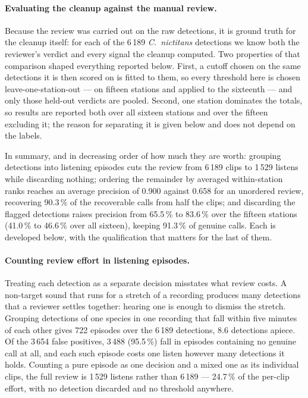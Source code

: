 \documentclass[final,3p,times]{elsarticle}
\begin{document}
\paragraph{Evaluating the cleanup against the manual review.}
Because the review was carried out on the raw detections, it is ground truth
for the cleanup itself: for each of the 6\,189 \textit{C.\ nictitans} detections
we know both the reviewer's verdict and every signal the cleanup computed. Two
properties of that comparison shaped everything reported below. First, a cutoff
chosen on the same detections it is then scored on is fitted to them, so every
threshold here is chosen leave-one-station-out --- on fifteen stations and
applied to the sixteenth --- and only those held-out verdicts are pooled.
Second, one station dominates the totals, so results are reported both over all
sixteen stations and over the fifteen excluding it; the reason for separating
it is given below and does not depend on the labels.

In summary, and in decreasing order of how much they are worth: grouping
detections into listening episodes cuts the review from 6\,189 clips to 1\,529
listens while discarding nothing; ordering the remainder by averaged
within-station ranks reaches an average precision of 0.900 against 0.658 for an
unordered review, recovering 90.3\,\% of the recoverable calls from half the
clips; and discarding the flagged detections raises precision from 65.5\,\% to
83.6\,\% over the fifteen stations (41.0\,\% to 46.6\,\% over all sixteen),
keeping 91.3\,\% of genuine calls. Each is developed below, with the
qualification that matters for the last of them.

\paragraph{Counting review effort in listening episodes.}
Treating each detection as a separate decision misstates what review costs. A
non-target sound that runs for a stretch of a recording produces many
detections that a reviewer settles together: hearing one is enough to dismiss
the stretch. Grouping detections of one species in one recording that fall
within five minutes of each other gives 722 episodes over the 6\,189
detections, 8.6 detections apiece. Of the 3\,654 false positives, 3\,488
(95.5\,\%) fall in episodes containing no genuine call at all, and each such
episode costs one listen however many detections it holds. Counting a pure
episode as one decision and a mixed one as its individual clips, the full
review is 1\,529 listens rather than 6\,189 --- 24.7\,\% of the per-clip effort,
with no detection discarded and no threshold anywhere.
\end{document}
